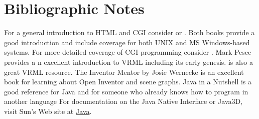 \section{Bibliographic Notes}
\label{sec:ch11.bibliographic_notes}

For a general introduction to HTML and CGI consider \cite{Morris95} or \cite{Graham95}. Both books provide a good introduction and include coverage for both UNIX and MS Windows-based systems. For more detailed coverage of CGI programming consider \cite{Gundavaram96}. Mark Pesce \cite{Pesce95} provides a n excellent introduction to VRML including its early genesis. \cite{Ames96} is also a great VRML resource. The Inventor Mentor by Josie Wernecke \cite{Wernecke94} is an excellent book for learning about Open Inventor and scene graphs. Java in a Nutshell \cite{Flanagan96} is a good reference for Java and for someone who already knows how to program in another language For documentation on the Java Native Interface or Java3D, visit Sun’s Web site at \href{https://www.java.com/en/}{Java}.


\printbibliography
